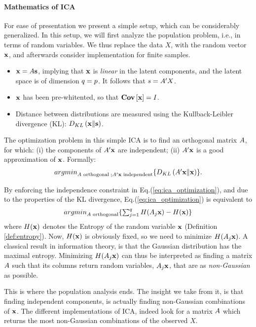 \documentclass[12pt,a4paper]{article}
\begin{document}
\paragraph{Mathematics of ICA}
For ease of presentation we present a simple setup, which can be considerably generalized. 
In this setup, we will first analyze the population problem, i.e., in terms of random variables. 
We thus replace the data $X$, with the random vector $\mathbf{x}$, and afterwards consider implementation for finite samples. 
\begin{itemize}
	\item $\mathbf{x}=A \mathbf{s}$, implying that $\mathbf{x}$ is \emph{linear} in the latent components, and the latent space is of dimension $q=p$. It follows that $s=A'X$.
	\item $\mathbf{x}$ has been pre-whitented, so that $\mathbf{Cov} \left[ \mathbf{x} \right]=I$.
	\item Distance between distributions are measured using the Kullback-Leibler divergence (KL): $D_{KL}\left(\mathbf{x} \Vert \mathbf{s} \right)$.
\end{itemize}

The optimization problem in this simple ICA is to find an orthogonal matrix $A$, for which:
(i) the components of $A'\mathbf{x}$ are independent;
(ii) $A'\mathbf{x}$ is a good approximation of $\mathbf{x}$.
Formally: 
\begin{align}
\label{eq:ica_optimization}
\textstyle{\mathop{argmin}_{A\text{ orthogonal} \;; A'\mathbf{x}\text{ independent}}}\{ D_{KL}\left(A'\mathbf{x} \Vert \mathbf{x} \right) \}.
\end{align}


By enforcing the independence constraint in Eq.(\ref{eq:ica_optimization}), and due to the properties of the KL divergence, Eq.(\ref{eq:ica_optimization}) is equivalent to
\begin{align}
\label{eq:ica_optimization2}
\textstyle{\mathop{argmin}_{A\text{ orthogonal}}}\{ \sum_{j=1}^{q} H(A_j\mathbf{x})- H(\mathbf{x}) \}
\end{align}
where $H(\mathbf{x})$ denotes the Entropy of the random variable $\mathbf{x}$ (Definition \ref{def:entropy}).
Now, $H(\mathbf{x})$ is obviously fixed, so we need to minimize $H(A_j\mathbf{x})$. 
A classical result in information theory, is that the Gaussian distribution has the maximal entropy. 
Minimizing $H(A_j\mathbf{x})$ can thus be interpreted as finding a matrix $A$ such that its columns return random variables, $A_j\mathbf{x}$, that are as \emph{non-Gaussian} as possible.

This is where the population analysis ends. 
The insight we take from it, is that finding independent components, is actually finding non-Gaussian combinations of $\mathbf{x}$. 
The different implementations of ICA, indeed look for a matrix $A$ which returns the most non-Gaussian combinations of the observed $X$. 
\end{document}
